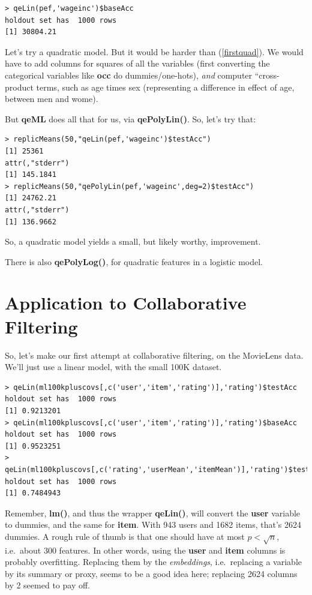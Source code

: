 \begin{lstlisting}
> qeLin(pef,'wageinc')$baseAcc
holdout set has  1000 rows
[1] 30804.21
\end{lstlisting}

Let's try a quadratic model.  But it would be harder than
(\ref{firstquad}).  We would have to add columns for squares of all the 
variables (first converting the categorical variables like \textbf{occ} 
do dummies/one-hots), \textit{and} computer ``cross-product terms, such
as age times sex (representing a difference in effect of age, between
men and wome).

But \textbf{qeML} does all that for us, via \textbf{qePolyLin()}.  So,
let's try that:

\begin{lstlisting}
> replicMeans(50,"qeLin(pef,'wageinc')$testAcc")
[1] 25361
attr(,"stderr")
[1] 145.1841
> replicMeans(50,"qePolyLin(pef,'wageinc',deg=2)$testAcc")
[1] 24762.21
attr(,"stderr")
[1] 136.9662
\end{lstlisting}

So, a quadratic model yields a small, but likely worthy, improvement.

There is also \textbf{qePolyLog()}, for quadratic features in a logistic
model.

\section{Application to Collaborative Filtering}

So, let's make our first attempt at collaborative filtering, on the
MovieLens data.  We'll just use a linear model, with the small 100K
dataset.

\begin{lstlisting}
> qeLin(ml100kpluscovs[,c('user','item','rating')],'rating')$testAcc
holdout set has  1000 rows
[1] 0.9213201
> qeLin(ml100kpluscovs[,c('user','item','rating')],'rating')$baseAcc
holdout set has  1000 rows
[1] 0.9523251
> qeLin(ml100kpluscovs[,c('rating','userMean','itemMean')],'rating')$testAcc
holdout set has  1000 rows
[1] 0.7484943
\end{lstlisting}

Remember, \textbf{lm()}, and thus the wrapper \textbf{qeLin()}, will
convert the \textbf{user} variable to dummies, and the same for
\textbf{item}.  With 943 users and 1682 items, that's 2624 dummies.
A rough rule of thumb is that one should have at most $p < \sqrt{n}$, i.e.\
about 300 features.  In other words, using the \textbf{user} and
\textbf{item} columns is probably overfitting.  Replacing them by the
\textit{embeddings}, i.e.\ replacing a variable by its summary or proxy,
seems to be a good idea here; replacing 2624 columns by 2 seemed to pay
off.

